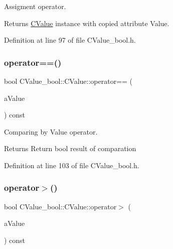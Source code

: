 Assigment operator. 

\begin{DoxyReturn}{Returns}
\hyperlink{class_c_value__bool_1_1_c_value}{C\+Value} instance with copied attribute Value. 
\end{DoxyReturn}


Definition at line 97 of file C\+Value\+\_\+bool.\+h.

\mbox{\label{class_c_value__bool_1_1_c_value_aa0ef6517b9d79e30e198d970ebb121c9}} 
\subsubsection{\texorpdfstring{operator==()}{operator==()}}
{\footnotesize\ttfamily bool C\+Value\+\_\+bool\+::\+C\+Value\+::operator== (\begin{DoxyParamCaption}\item[{const \hyperlink{class_c_value__bool_1_1_c_value}{C\+Value} \&}]{a\+Value }\end{DoxyParamCaption}) const\hspace{0.3cm}{\ttfamily [inline]}}



Comparing by Value operator. 

\begin{DoxyReturn}{Returns}
Return {\ttfamily bool} result of comparation 
\end{DoxyReturn}


Definition at line 103 of file C\+Value\+\_\+bool.\+h.

\mbox{\label{class_c_value__bool_1_1_c_value_ac1f4a9bb08a0538073455f303f853c12}} 
\subsubsection{\texorpdfstring{operator$>$()}{operator>()}}
{\footnotesize\ttfamily bool C\+Value\+\_\+bool\+::\+C\+Value\+::operator$>$ (\begin{DoxyParamCaption}\item[{const \hyperlink{class_c_value__bool_1_1_c_value}{C\+Value} \&}]{a\+Value }\end{DoxyParamCaption}) const\hspace{0.3cm}{\ttfamily [inline]}}



